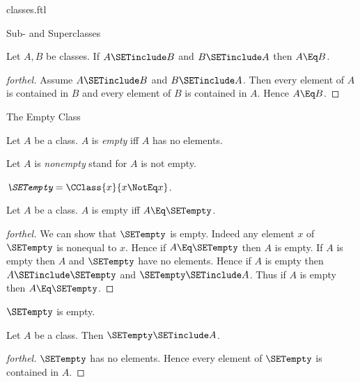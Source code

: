 \documentclass{stex}
\begin{document}
\begin{smodule}{classes.ftl}
\begin{sfragment}{Sub- and Superclasses}
  \begin{proposition}[forthel,id=FOUNDATIONS_01_7159957847801856]
    Let $A, B$ be classes.
    If $A \SETinclude B$ and $B \SETinclude A$ then $A \Eq B$.
  \end{proposition}
  \begin{proof}[forthel]
    Assume $A \SETinclude B$ and $B \SETinclude A$.
    Then every element of $A$ is contained in $B$ and every element of $B$ is contained in $A$.
    Hence $A \Eq B$.
  \end{proof}
\end{sfragment}

\begin{sfragment}{The Empty Class}
  \begin{definition}[forthel,id=FOUNDATIONS_01_6252477624090624]
    Let $A$ be a class.
    $A$ is \emph{empty} iff $A$ has no elements.

    Let $A$ is \emph{nonempty} stand for $A$ is not empty.
  \end{definition}

  \begin{definition}[forthel,id=FOUNDATIONS_01_7939928493129728]
    $\emph{\SETempty} = \CClass{x}{x \NotEq x}$.
  \end{definition}

  \begin{proposition}[forthel,id=FOUNDATIONS_01_2263153161273344]
    Let $A$ be a class.
    $A$ is empty iff $A \Eq \SETempty$.
  \end{proposition}
  \begin{proof}[forthel]
    We can show that $\SETempty$ is empty.
    Indeed any element $x$ of $\SETempty$ is nonequal to $x$.
    Hence if $A \Eq \SETempty$ then $A$ is empty.
    If $A$ is empty then $A$ and $\SETempty$ have no elements.
    Hence if $A$ is empty then $A \SETinclude \SETempty$ and $\SETempty \SETinclude A$.
    Thus if $A$ is empty then $A \Eq \SETempty$.
  \end{proof}

  \begin{corollary}[forthel,id=FOUNDATIONS_01_1495141426659328]
    $\SETempty$ is empty.
  \end{corollary}

  \begin{corollary}[forthel,id=FOUNDATIONS_01_6931785090859008]
    Let $A$ be a class.
    Then $\SETempty \SETinclude A$.
  \end{corollary}
  \begin{proof}[forthel]
    $\SETempty$ has no elements.
    Hence every element of $\SETempty$ is contained in $A$.
  \end{proof}
\end{sfragment}


\end{smodule}
\end{document}
